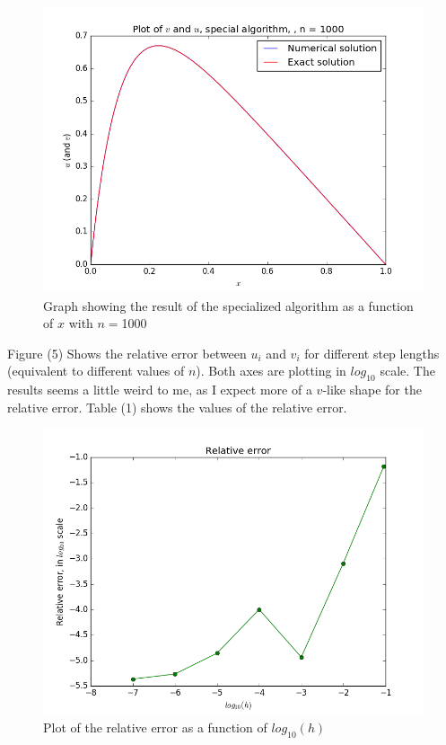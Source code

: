 \documentclass[12pt]{article}
\begin{document}
\begin{figure}[hbtp]
\centering
\includegraphics[scale=0.5]{Data_plots/Simplified_data_n1000.png}
\caption{Graph showing the result of the specialized algorithm as a function of $x$ with $n=$1000}
\end{figure}

Figure (5) Shows the relative error between $u_i$ and $v_i$ for different step lengths (equivalent to different values of $n$). Both axes are plotting in $log_{10}$ scale. The results seems a little weird to me, as I expect more of a $v$-like shape for the relative error. Table (1) shows the values of the relative error.

\begin{figure}[hbtp]
\centering
\includegraphics[scale=0.5]{Data_plots/Relative_error.png}
\caption{Plot of the relative error as a function of $log_{10}(h)$}
\end{figure}
\end{document}
